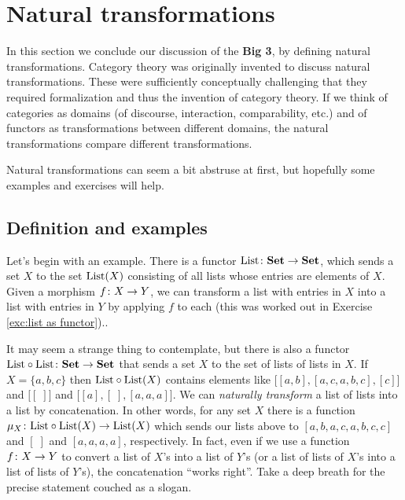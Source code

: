 

\section{Natural transformations}\label{sec:nat trans}

In this section we conclude our discussion of the {\bf Big 3}, by defining natural transformations. Category theory was originally invented to discuss natural transformations. These were sufficiently conceptually challenging that they required formalization and thus the invention of category theory. If we think of categories as domains (of discourse, interaction, comparability, etc.) and of functors as transformations between different domains, the natural transformations compare different transformations.

Natural transformations can seem a bit abstruse at first, but hopefully some examples and exercises will help.


\subsection{Definition and examples}

Let's begin with an example. There is a functor $\textnormal{List}\colon{\bf Set}\rightarrow{\bf Set}$, which sends a set $X$ to the set $\textnormal{List}(X)$ consisting of all lists whose entries are elements of $X$. Given a morphism $f\colon X\rightarrow Y$, we can transform a list with entries in $X$ into a list with entries in $Y$ by applying $f$ to each (this was worked out in Exercise \ref{exc:list as functor}).. 

It may seem a strange thing to contemplate, but there is also a functor $\textnormal{List}\circ\textnormal{List}\colon{\bf Set}\rightarrow{\bf Set}$ that sends a set $X$ to the set of lists of lists in $X$. If $X=\{a,b,c\}$ then $\textnormal{List}\circ\textnormal{List}(X)$ contains elements like $\big[[a,b],[a,c,a,b,c],[c]\big]$ and $\big[[\;]\big]$ and $\big[[a],[\;],[a,a,a]\big]$. We can {\em naturally transform} a list of lists into a list by concatenation. In other words, for any set $X$ there is a function $\mu_X\colon\textnormal{List}\circ\textnormal{List}(X)\rightarrow\textnormal{List}(X)$ which sends our lists above to $[a,b,a,c,a,b,c,c]$ and $[\;]$ and $[a,a,a,a]$, respectively. In fact, even if we use a function $f\colon X\rightarrow Y$ to convert a list of $X$'s into a list of $Y$'s (or a list of lists of $X$'s into a list of lists of $Y$'s), the concatenation “works right”. Take a deep breath for the precise statement couched as a slogan.

